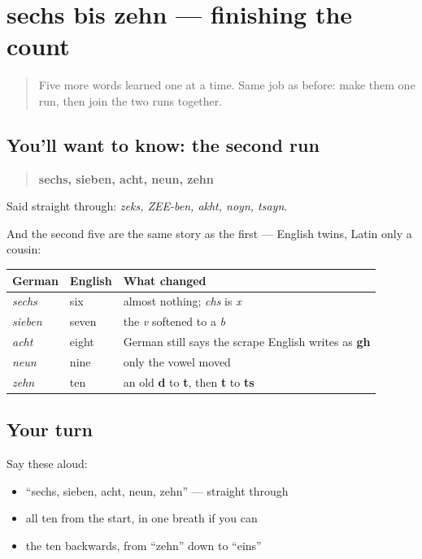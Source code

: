 \section[Practice]{sechs bis zehn — finishing the count}

\label{lesson:GE-C06-zahlen-6-10}



\begin{quote}
Five more words learned one at a time. Same job as before: make them one run, then join the two runs together.
\end{quote}

\subsection*{You'll want to know: the second run}
\begin{quote}
\textbf{sechs, sieben, acht, neun, zehn}
\end{quote}

Said straight through: \emph{zeks, ZEE-ben, akht, noyn, tsayn}.

And the second five are the same story as the first — English twins, Latin only a cousin:

\noindent
\begin{tabularx}{\linewidth}{@{}>{\raggedright\arraybackslash}X>{\raggedright\arraybackslash}X>{\raggedright\arraybackslash}X@{}}
\toprule
\textbf{German} & \textbf{English} & \textbf{What changed} \\
\midrule
\emph{sechs} & six & almost nothing; \emph{chs} is \emph{x} \\
\emph{sieben} & seven & the \emph{v} softened to a \emph{b} \\
\emph{acht} & eight & German still says the scrape English writes as \textbf{gh} \\
\emph{neun} & nine & only the vowel moved \\
\emph{zehn} & ten & an old \textbf{d} to \textbf{t}, then \textbf{t} to \textbf{ts} \\
\bottomrule
\end{tabularx}

\subsection*{Your turn}
Say these aloud:

\begin{itemize}
\raggedright
  \item \textquotedblleft{}sechs, sieben, acht, neun, zehn\textquotedblright{} — straight through
  \item all ten from the start, in one breath if you can
  \item the ten backwards, from \textquotedblleft{}zehn\textquotedblright{} down to \textquotedblleft{}eins\textquotedblright{}
\end{itemize}

